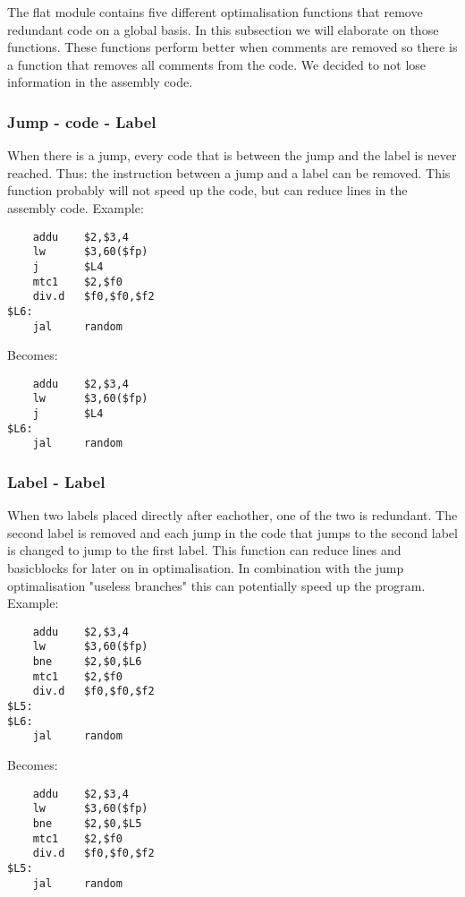 \lstset{ %
language=[mips]Assembler,         %
}

The flat module contains five different optimalisation functions that remove
redundant code on a global basis. In this subsection we will elaborate on those 
functions. These functions perform better when comments are removed so there is
a function that removes all comments from the code. We decided to not lose 
information in the assembly code.
\subsubsection{Jump - code - Label}
When there is a jump, every code that is between the jump and the label is 
never reached. Thus: the instruction between a jump and a label can be removed.
This function probably will not speed up the code, but can reduce
lines in the assembly code.
Example:
\begin{lstlisting}
    addu    $2,$3,4
    lw      $3,60($fp)
    j       $L4
    mtc1    $2,$f0
    div.d   $f0,$f0,$f2	
$L6:
    jal     random 
\end{lstlisting}
Becomes:
\begin{lstlisting}
    addu    $2,$3,4
    lw      $3,60($fp)
    j       $L4
$L6:
    jal	    random 
\end{lstlisting}
\subsubsection{Label - Label}
When two labels placed directly after eachother, one of the two is redundant.
The second label is removed and each jump in the code that jumps to the second 
label is changed to jump to the first label. This function can reduce lines and
basicblocks for later on in optimalisation. In combination with the jump 
optimalisation "useless branches" this can potentially speed up the program.
Example:
\begin{lstlisting}
    addu    $2,$3,4
    lw      $3,60($fp)
    bne     $2,$0,$L6
    mtc1    $2,$f0
    div.d   $f0,$f0,$f2	
$L5:
$L6:
    jal	    random 
\end{lstlisting}
Becomes:
\begin{lstlisting}
    addu    $2,$3,4
    lw      $3,60($fp)
    bne     $2,$0,$L5
    mtc1    $2,$f0
    div.d   $f0,$f0,$f2	
$L5:
    jal     random 
\end{lstlisting}
